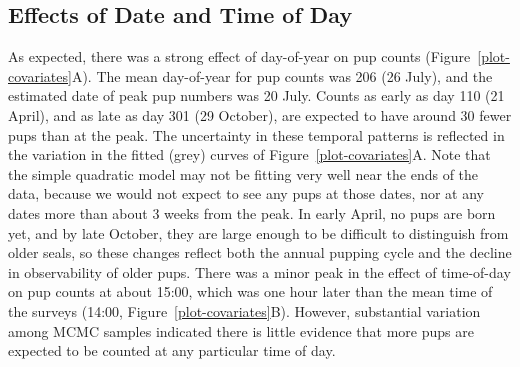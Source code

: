 \documentclass[]{risa}\usepackage[]{graphicx}\usepackage[]{color}
\begin{document}

\subsection{Effects of Date and Time of Day}


As expected, there was a strong effect of day-of-year on pup counts (Figure~\ref{plot-covariates}A). The mean day-of-year for pup counts was 206 (26 July), and the estimated date of peak pup numbers was 20 July.  Counts as early as day 110 (21 April), and as late as day 301 (29 October), are expected to have around 30 fewer pups than at the peak.  The uncertainty in these temporal patterns is reflected in the variation in the fitted (grey) curves of Figure~\ref{plot-covariates}A. Note that the simple quadratic model may not be fitting very well near the ends of the data, because we would not expect to see any pups at those dates, nor at any dates more than about 3 weeks from the peak. In early April, no pups are born yet, and by late October, they are large enough to be difficult to distinguish from older seals, so these changes reflect both the annual pupping cycle and the decline in observability of older pups. There was a minor peak in the effect of time-of-day on pup counts at about 15:00, which was one hour later than the mean time of the surveys (14:00, Figure~\ref{plot-covariates}B). However, substantial variation among MCMC samples indicated there is little evidence that more pups are expected to be counted at any particular time of day. 

\end{document}
